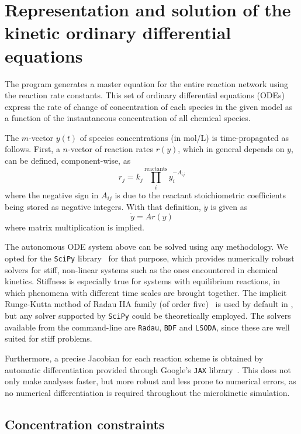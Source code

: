 \section{Representation and solution of the kinetic ordinary differential equations}

The program generates a master equation for the entire reaction network using the reaction rate constants.
This set of ordinary differential equations (ODEs) express the rate of change of concentration of each species in the given model as a function of the instantaneous concentration of all chemical species.

The $m$-vector $y(t)$ of species concentrations (in mol/L) is time-propagated as follows.
First,
a $n$-vector of reaction rates $r(y)$,
which in general depends on $y$,
can be defined,
component-wise,
as
% 
\begin{equation}
	r_j
	= k_j \prod_i^\text{reactants}
	y_i^{-A_{ij}}
\end{equation}
% 
where the negative sign in $A_{ij}$ is due to the reactant stoichiometric coefficients being stored as negative integers.
With that definition,
$\dot{y}$ is given as
% 
\begin{equation}
	\dot{y} = A r(y)
\end{equation}
% 
where matrix multiplication is implied.

The autonomous ODE system above can be solved using any methodology.
We opted for the \texttt{SciPy} library~\cite{Virtanen_2020} for that purpose,
which provides numerically robust solvers for stiff,
non-linear systems such as the ones encountered in chemical kinetics.
Stiffness is especially true for systems with equilibrium reactions,
in which phenomena with different time scales are brought together.
The implicit Runge-Kutta method of Radau IIA family (of order five)~\cite{Hairer_1996} is used by default in \overreact,
but any solver supported by \texttt{SciPy} could be theoretically employed.
The solvers available from the command-line are \texttt{Radau},
\texttt{BDF} and \texttt{LSODA},
since these are well suited for stiff problems.

Furthermore,
a precise Jacobian for each reaction scheme is obtained by automatic differentiation provided through Google's \texttt{JAX} library~\cite{jax2018github}.
This does not only make analyses faster,
but more robust and less prone to numerical errors,
as no numerical differentiation is required throughout the microkinetic simulation.

\subsection{Concentration constraints}

